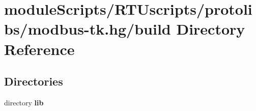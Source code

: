 \section{module\+Scripts/\+R\+T\+Uscripts/protolibs/modbus-\/tk.hg/build Directory Reference}
\label{dir_febd6e4c4d8474ce5c341e5cf22b0afc}
\subsection*{Directories}
\begin{DoxyCompactItemize}
\item 
directory {\bf lib}
\end{DoxyCompactItemize}
